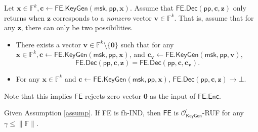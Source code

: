 \begin{assumption}
\label{assump}
Let $\mathbf{x} \in \mathbb{F}^k, \mathbf{c} \gets \textsf{FE.KeyGen}(\textsf{msk}, \textsf{pp}, \mathbf{x})$. Assume that $\textsf{FE.Dec}(\textsf{pp}, \mathbf{c}, \mathbf{z})$ only returns when $\mathbf{z}$ corresponds to a \emph{nonzero} vector $\mathbf{v} \in \mathbb{F}^k$. That is, assume that for any $\mathbf{z}$, there can only be two possibilities.

\begin{itemize}
	\item There exists a vector $\mathbf{v} \in \mathbb{F}^k \setminus \{\mathbf{0}\}$ such that for any $\mathbf{x} \in \mathbb{F}^k, \mathbf{c} \gets \textsf{FE.KeyGen}(\textsf{msk}, \textsf{pp}, \mathbf{x})$, and $\mathbf{c_v} \gets \textsf{FE.KeyGen}(\textsf{msk}, \textsf{pp}, \mathbf{v})$, 
	\[
		\textsf{FE.Dec}(\textsf{pp}, \mathbf{c}, \mathbf{z}) = \textsf{FE.Dec}(\textsf{pp}, \mathbf{c}, \mathbf{c_v}).
	\]
	\item For any $\mathbf{x} \in \mathbb{F}^k$ and $ \mathbf{c} \gets \textsf{FE.KeyGen}(\textsf{msk}, \textsf{pp}, \mathbf{x})$, $\textsf{FE.Dec}(\textsf{pp}, \mathbf{c}, \mathbf{z}) \to \bot$.

\end{itemize}
Note that this implies $\textsf{FE}$ rejects zero vector $\mathbf{0}$ as the input of $\textsf{FE.Enc}$.
\end{assumption}

\begin{theorem}
\label{thm:fh-IPFE:ind-OKeyGen-ruf}
Given Assumption \ref{assump}. If \textsf{FE} is fh-IND, then $\textsf{FE}$ is $\mathcal{O}^\prime_{\textsf{KeyGen}}$-RUF for any $\gamma \leq \|\mathbb{F}\|$.

\end{theorem}

